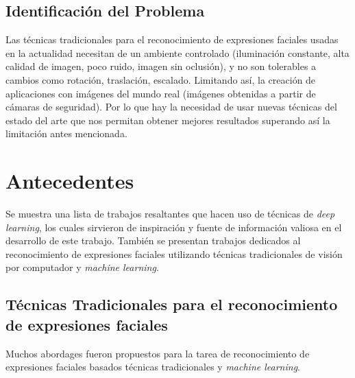 \subsection{Identificación del Problema}
Las técnicas tradicionales para el reconocimiento de expresiones faciales usadas en la actualidad necesitan de un ambiente controlado (iluminación constante, alta calidad de imagen, poco ruido, imagen sin oclusión), y no son tolerables a cambios como rotación, traslación, escalado. Limitando así, la creación de aplicaciones con imágenes del mundo real (imágenes obtenidas a partir de cámaras de seguridad). Por lo que hay la necesidad de usar nuevas técnicas del estado del arte que nos permitan obtener mejores resultados superando así la limitación antes mencionada.

\section{Antecedentes}
Se muestra una lista de trabajos resaltantes que hacen uso de técnicas de \textit{deep learning}, los cuales sirvieron de inspiración y fuente de información valiosa en el desarrollo de este trabajo. También se presentan trabajos dedicados al reconocimiento de expresiones faciales utilizando técnicas tradicionales de visión por computador y \textit{machine learning}.

\subsection{Técnicas Tradicionales para el reconocimiento de expresiones faciales}
Muchos abordages fueron propuestos para la tarea de reconocimiento de expresiones faciales basados técnicas tradicionales y \textit{machine learning}. 

